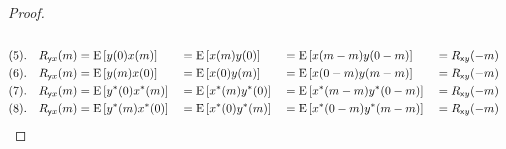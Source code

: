 \begin{proof}
\begin{align*}
    \\
    (5).\quad R_{{\mathsf yx}}(m)
      &=  \operatorname{E}{\left[y(0)x(m)\right]}
     &&=     \operatorname{E}{\left[x(m)y(0)\right]}
     &&=     \operatorname{E}{\left[x(m-m)y(0-m)\right]}
     &&= R_{{\mathsf xy}}(-m)
    \\
    (6).\quad R_{{\mathsf yx}}(m)
      &=  \operatorname{E}{\left[y(m)x(0)\right]}
     &&=     \operatorname{E}{\left[x(0)y(m)\right]}
     &&=     \operatorname{E}{\left[x(0-m)y(m-m)\right]}
     &&= R_{{\mathsf xy}}(-m)
    \\
    (7).\quad R_{{\mathsf yx}}(m)
      &=  \operatorname{E}{\left[y^\ast(0)x^\ast(m)\right]}
     &&=     \operatorname{E}{\left[x^\ast(m)y^\ast(0)\right]}
     &&=     \operatorname{E}{\left[x^\ast(m-m)y^\ast(0-m)\right]}
     &&= R_{{\mathsf xy}}(-m)
    \\
    (8).\quad R_{{\mathsf yx}}(m)
      &=  \operatorname{E}{\left[y^\ast(m)x^\ast(0)\right]}
     &&=     \operatorname{E}{\left[x^\ast(0)y^\ast(m)\right]}
     &&=     \operatorname{E}{\left[x^\ast(0-m)y^\ast(m-m)\right]}
     &&= R_{{\mathsf xy}}(-m)
\end{align*}

\end{proof}

